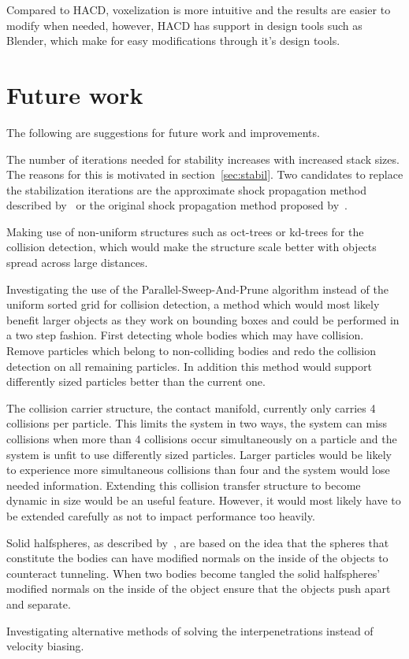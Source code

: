 Compared to HACD, voxelization is more intuitive and the results are easier to modify
when needed, however, HACD has support in design tools such as Blender, which make
for easy modifications through it's design tools.

\section{Future work}
The following are suggestions for future work and improvements.

The number of iterations needed for stability increases with increased stack sizes.
The reasons for this is motivated in section~\ref{sec:stabil}.
Two candidates to replace the stabilization iterations are
the approximate shock propagation method described by~\cite{flex} or the original
shock propagation method proposed by~\cite{guendelman}.

Making use of non-uniform structures such as oct-trees or kd-trees for the collision
detection, which would make the structure scale better with objects spread across
large distances.

Investigating the use of the Parallel-Sweep-And-Prune algorithm instead of the
uniform sorted grid for collision detection, a method which would most likely
benefit larger objects as they work on bounding boxes and could be performed
in a two step fashion. First detecting whole bodies which may have collision.
Remove particles which belong to non-colliding bodies and redo the collision detection
on all remaining particles. In addition this method would support differently sized
particles better than the current one.

The collision carrier structure, the contact manifold, currently only carries
4 collisions per particle. This limits the system in two ways, the system can miss
collisions when more than 4 collisions occur simultaneously on a particle and the
system is unfit to use differently sized particles. Larger particles would
be likely to experience more simultaneous collisions than four and the system would
lose needed information. Extending this collision transfer structure to become dynamic
in size would be an useful feature. However, it would most likely have
to be extended carefully as not to impact performance too heavily.

Solid halfspheres, as described by~\cite{flex}, are based on the idea that the spheres that
constitute the bodies can have modified normals on the inside of the objects to counteract
tunneling. When two bodies become tangled the solid halfspheres' modified normals
on the inside of the object ensure that the objects push apart and separate.

Investigating alternative methods of solving the interpenetrations instead of velocity biasing.
